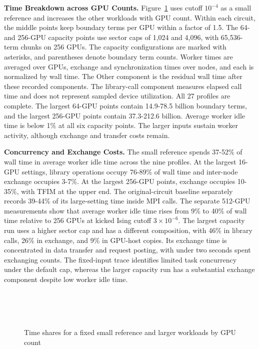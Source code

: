 \noindent\textbf{Time Breakdown across GPU Counts.}
Figure~\ref{fig:runtime} uses cutoff $10^{-4}$ as a small reference and increases the other workloads with GPU count.
Within each circuit, the middle points keep boundary terms per GPU within a factor of 1.5.
The 64- and 256-GPU capacity points use sector caps of 1,024 and 4,096, with 65,536-term chunks on 256 GPUs.
The capacity configurations are marked with asterisks, and parentheses denote boundary term counts.
Worker times are averaged over GPUs, exchange and synchronization times over nodes, and each is normalized by wall time.
The Other component is the residual wall time after these recorded components.
The library-call component measures elapsed call time and does not represent sampled device utilization.
All 27 profiles are complete.
The largest 64-GPU points contain 14.9-78.5 billion boundary terms, and the largest 256-GPU points contain 37.3-212.6 billion.
Average worker idle time is below 1\% at all six capacity points.
The larger inputs sustain worker activity, although exchange and transfer costs remain.

\noindent\textbf{Concurrency and Exchange Costs.}
The small reference spends 37-52\% of wall time in average worker idle time across the nine profiles.
At the largest 16-GPU settings, library operations occupy 76-89\% of wall time and inter-node exchange occupies 3-7\%.
At the largest 256-GPU points, exchange occupies 10-35\%, with TFIM at the upper end.
The original-circuit \cuPP baseline separately records 39-44\% of its large-setting time inside MPI calls.
The separate 512-GPU measurements show that average worker idle time rises from 9\% to 40\% of wall time relative to 256 GPUs at kicked Ising cutoff $3\times10^{-6}$.
The largest capacity run uses a higher sector cap and has a different composition, with 46\% in library calls, 26\% in exchange, and 9\% in GPU-host copies.
Its exchange time is concentrated in data transfer and request posting, with under two seconds spent exchanging counts.
The fixed-input trace identifies limited task concurrency under the default cap, whereas the larger capacity run has a substantial exchange component despite low worker idle time.

\begin{figure}[tp]
\centering
{}\\[-2pt]
\hfill
{}\hfill
{}\\[4pt]
\hfill
{}\hfill
{}\\[4pt]
\hfill
{}\hfill
{}
\caption{Time shares for a fixed small reference and larger workloads by GPU count}
\label{fig:runtime}
\end{figure}


